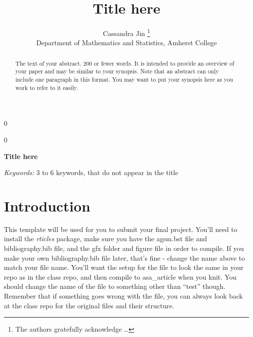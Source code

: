 \documentclass[12pt]{article}
\newcommand{\blind}{0}
\begin{document}
\def\spacingset#1{\renewcommand{\baselinestretch}%
{#1}\small\normalsize} \spacingset{1}



\blind
{
  \title{\bf Title here}

  \author{
        Cassandra Jin \thanks{The authors gratefully acknowledge
\ldots{}} \\
    Department of Mathematics and Statistics, Amherst College\\
      }
  \maketitle
} \fi

\blind
{
  \bigskip
  \bigskip
  \bigskip
  \begin{center}
    {\LARGE\bf Title here}
  \end{center}
  \medskip
} \fi

\bigskip
\begin{abstract}
The text of your abstract. 200 or fewer words. It is intended to provide
an overview of your paper and may be similar to your synopsis. Note that
an abstract can only include one paragraph in this format. You may want
to put your synopsis here as you work to refer to it easily.
\end{abstract}

\noindent%
{\it Keywords:} 3 to 6 keywords, that do not appear in the title

\vfill

\newpage
\spacingset{1.9} %

\hypertarget{introduction}{%
\section{Introduction}\label{introduction}}

This template will be used for you to submit your final project. You'll
need to install the \emph{rticles} package, make sure you have the
agsm.bst file and bibliography.bib file, and the gfx folder and figure
file in order to compile. If you make your own bibliography.bib file
later, that's fine - change the name above to match your file name.
You'll want the setup for the file to look the same in your repo as in
the class repo, and then compile to asa\_article when you knit. You
should change the name of the file to something other than ``test''
though. Remember that if something goes wrong with the file, you can
always look back at the class repo for the original files and their
structure.
\end{document}
